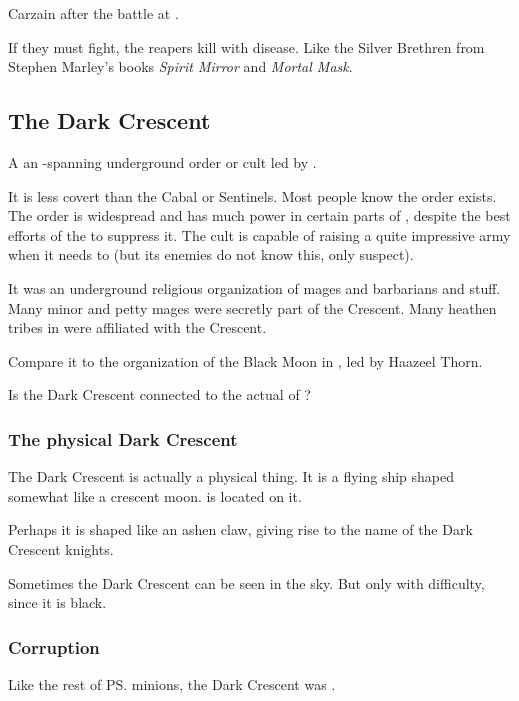 Carzain  after the battle at \Forklin.

If they must fight, the reapers kill with disease. Like the Silver Brethren from Stephen Marley's books \emph{Spirit Mirror} and \emph{Mortal Mask}. 









\subsection{The Dark Crescent}
A an \Azmith-spanning underground order or cult led by \LocarPsyrex. 

It is less covert than the Cabal or Sentinels. Most people know the order exists. The order is widespread and has much power in certain parts of \Velcad{}, despite the best efforts of the  to suppress it. The cult is capable of raising a quite impressive army when it needs to (but its enemies do not know this, only suspect). 

It was an underground religious organization of mages and barbarians and stuff.
Many minor \rethyaxes and petty mages were secretly part of the Crescent.
Many heathen tribes in \Velcad were affiliated with the Crescent.

Compare it to the organization of the Black Moon in \FLuneNoire, led by Haazeel Thorn. 

Is the Dark Crescent connected to the actual  of \Miith{}? 





\subsubsection{The physical Dark Crescent}
The Dark Crescent is actually a physical thing. It is a flying ship shaped somewhat like a crescent moon.  is located on it. 

Perhaps it is shaped like an ashen claw, giving rise to the name of the Dark Crescent knights. 

Sometimes the Dark Crescent can be seen in the sky. But only with difficulty, since it is black. 





\subsubsection{Corruption}
Like the rest of \ps{\Secherdamon} minions, the Dark Crescent was . 





